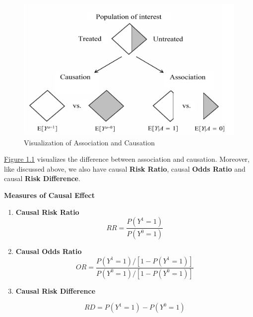 \begin{figure}
    \centering
    \includegraphics[width=.7\linewidth]{codes/figures/section1/figure_1_1.png}
    \caption{Visualization of Association and Causation}
    \label{fig:as_ca}
\end{figure}
\hyperref[fig:as_ca]{Figure 1.1} visualizes the difference between association and causation. Moreover, like discussed above, we also have causal \textbf{Risk Ratio}, causal \textbf{Odds Ratio} and causal \textbf{Risk Difference}.
\begin{definition}
    \textbf{Measures of Causal Effect}\\
    \begin{enumerate}
        \item \textbf{Causal Risk Ratio}
        $$
        R R=\frac{P\left(Y^1=1\right)}{P\left(Y^0=1\right)}
        $$
        
        \item \textbf{Causal Odds Ratio}
        $$
        O R=\frac{P\left(Y^1=1\right) /\left[1-P\left(Y^1=1\right)\right]}{P\left(Y^0=1\right) /\left[1-P\left(Y^0=1\right)\right]}
        $$

        \item \textbf{Causal Risk Difference}
        
        $$
        R D=P\left(Y^1=1\right)-P\left(Y^0=1\right)
        $$
    \end{enumerate}
\end{definition}
